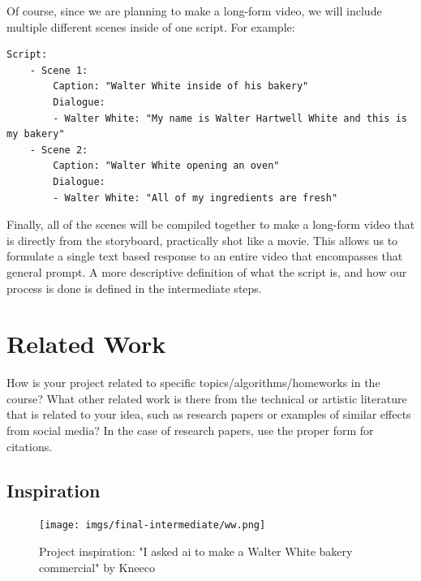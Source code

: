 \documentclass[conference]{IEEEtran}
\begin{document}
Of course, since we are planning to make a long-form video, we will include multiple different scenes inside of one script. For example:
\begin{lstlisting}
Script:
    - Scene 1:
        Caption: "Walter White inside of his bakery"
        Dialogue: 
        - Walter White: "My name is Walter Hartwell White and this is my bakery"
    - Scene 2:
        Caption: "Walter White opening an oven"
        Dialogue: 
        - Walter White: "All of my ingredients are fresh"
\end{lstlisting}

Finally, all of the scenes will be compiled together to make a long-form video that is directly from the storyboard, practically shot like a movie. This allows us to formulate a single text based response to an entire video that encompasses that general prompt. A more descriptive definition of what the script is, and how our process is done is defined in the intermediate steps.


\section{Related Work}

\begin{tcolorbox}
How is your project related to specific topics/algorithms/homeworks in the course? What other related work is there from the technical or artistic literature that is related to your idea, such as research papers or examples of similar effects from social media? In the case of research papers, use the proper form for citations.
\end{tcolorbox}

\subsection{Inspiration}

\begin{figure}[ht]
    \begin{center}
        \texttt{[image: imgs/final-intermediate/ww.png]}
    \end{center}
    \caption{Project inspiration: "I asked ai to make a Walter White bakery commercial" by Kneeco \cite{breakingbread}}
    \label{fig:ww}
\end{figure}
\end{document}
